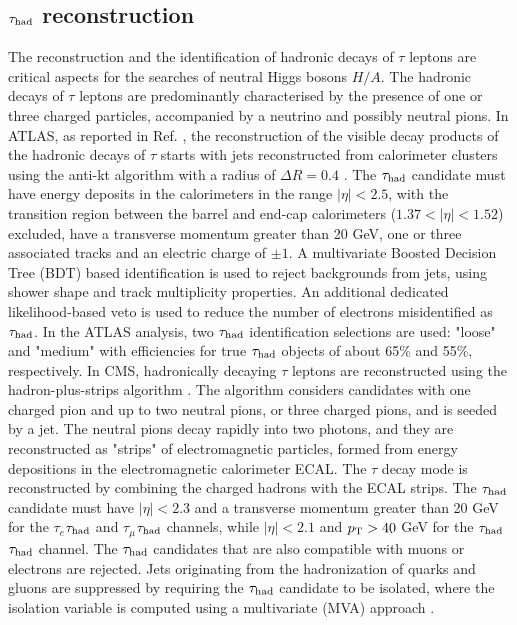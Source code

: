 \subsection{$\tau_{\rm had}$ reconstruction}
The reconstruction and the identification of hadronic decays of $\tau$ leptons are critical aspects for the searches of neutral  Higgs bosons $H/A$.
The hadronic decays of $\tau$ leptons are predominantly characterised by the presence of one or three charged particles, accompanied by a neutrino and possibly neutral pions. In ATLAS, as reported in Ref. \cite{ATL-PHYS-PUB-2015-045}, the reconstruction of the visible decay products of the hadronic decays of $\tau$ %
starts with jets reconstructed from calorimeter clusters using the anti-kt algorithm with a radius of $\Delta R = 0.4$ \cite{Cacciari:2008gp}. The $\tau_{\rm had}$ candidate must have energy deposits in the calorimeters in the range $|\eta| < 2.5$, with the transition region between the barrel and end-cap calorimeters ($1.37 < |\eta| < 1.52$) excluded, have a transverse momentum greater than 20 GeV, one or three associated tracks and an electric charge of $\pm1$. A multivariate Boosted Decision Tree (BDT) based identification is used to reject backgrounds from jets, using shower shape and track multiplicity properties. An additional dedicated likelihood-based veto is used to reduce the number of electrons misidentified as $\tau_{\rm had}$. In the ATLAS analysis, two $\tau_{\rm had}$ identification selections are used: "loose" and "medium" with efficiencies for true $\tau_{\rm had}$ objects of about 65\% and 55\%, respectively. In CMS, hadronically decaying $\tau$ leptons are reconstructed using the hadron-plus-strips algorithm \cite{Khachatryan:2015dfa}.
The algorithm considers candidates with one charged pion and up to two neutral pions, or
three charged pions, and is seeded by a jet. The neutral pions decay rapidly into two photons,
and they are reconstructed as "strips" of electromagnetic particles, formed from energy depositions in the electromagnetic calorimeter ECAL. 
The $\tau$ decay mode is reconstructed by combining the charged hadrons with the ECAL strips. 
The $\tau_{\rm had}$ candidate must have $|\eta| < 2.3$ and a transverse momentum greater than 20 GeV for the $\tau_{e}$$\tau_{\rm had}$ and  $\tau_{\mu}$$\tau_{\rm had}$ channels, while $|\eta| < 2.1$ and $p_{\rm T}>40$ GeV for the  $\tau_{\rm had}$$\tau_{\rm had}$ channel. The $\tau_{\rm had}$ candidates that are also compatible with muons
or electrons are rejected. Jets originating from the hadronization of quarks and gluons are suppressed
by requiring the $\tau_{\rm had}$ candidate to be isolated, where the isolation variable is computed using
a multivariate (MVA) approach \cite{Khachatryan:2015dfa}. 

